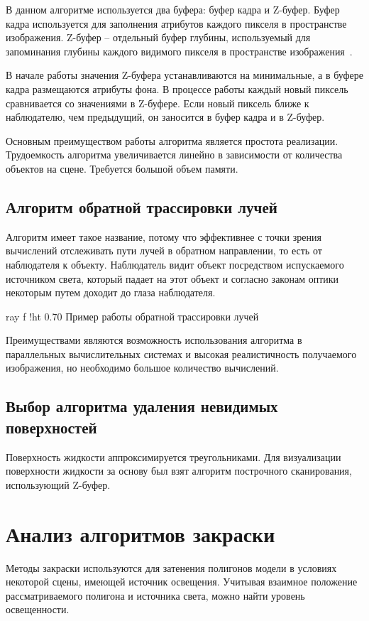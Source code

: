 В данном алгоритме используется два буфера: буфер кадра и Z-буфер. 
Буфер кадра используется для заполнения атрибутов каждого пикселя в пространстве изображения.  
Z-буфер – отдельный буфер глубины, используемый для запоминания глубины каждого видимого пикселя в пространстве изображения~\cite{ROB}.

В начале работы значения Z-буфера устанавливаются на минимальные, а в буфере кадра размещаются атрибуты фона. 
В процессе работы каждый новый пиксель сравнивается со значениями в Z-буфере. 
Если новый пиксель ближе к наблюдателю, чем предыдущий, он заносится в буфер кадра и в Z-буфер. 

Основным преимуществом работы алгоритма является простота реализации. 
Трудоемкость алгоритма увеличивается линейно в зависимости от количества объектов на сцене. 
Требуется большой объем памяти.

\subsection{Алгоритм обратной трассировки лучей}

Алгоритм имеет такое название, потому что эффективнее с точки зрения вычислений отслеживать пути лучей в обратном направлении, то есть от наблюдателя к объекту. Наблюдатель видит объект посредством испускаемого источником света, который падает на этот объект и согласно законам оптики некоторым путем доходит до глаза наблюдателя. 

    {ray}
    {f}
    {!ht}
    {0.70\textwidth}
    {Пример работы обратной трассировки лучей}

Преимуществами являются возможность использования алгоритма в параллельных вычислительных системах и высокая реалистичность получаемого изображения, но необходимо большое количество вычислений.

\subsection{Выбор алгоритма удаления невидимых поверхностей}
Поверхность жидкости аппроксимируется треугольниками. 
Для визуализации поверхности жидкости за основу был взят 
алгоритм построчного сканирования, использующий Z-буфер. 

\newpage 

\section{Анализ алгоритмов закраски}
Методы закраски используются для затенения полигонов модели в условиях некоторой сцены,
имеющей источник освещения. 
Учитывая взаимное положение рассматриваемого полигона и источника света, можно найти уровень освещенности. 

